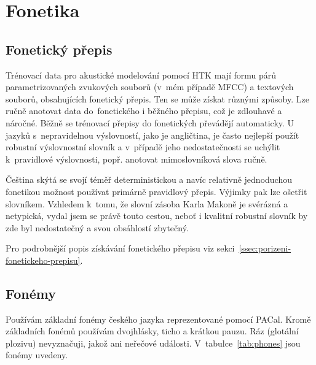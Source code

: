 \section{Fonetika}
\label{sec:ac:fonetika}

\subsection{Fonetický přepis}

Trénovací data pro akustické modelování pomocí HTK mají formu párů
parametrizovaných zvukových souborů (v~mém případě MFCC) a textových souborů,
obsahujících fonetický přepis. Ten se může získat různými způsoby. Lze ručně
anotovat data do~fonetického i běžného přepisu, což je zdlouhavé a náročné. Běžně
se trénovací přepisy do fonetických převádějí automaticky. U jazyků
s~nepravidelnou výslovností, jako je angličtina, je často nejlepší použít
robustní výslovnostní slovník a v~případě jeho nedostatečnosti se uchýlit
k~pravidlové výslovnosti, popř. anotovat mimoslovníková slova ručně.

Čeština skýtá se svojí téměř deterministickou a navíc relativně jednoduchou
fonetikou možnost používat primárně pravidlový přepis. Výjimky pak lze ošetřit
slovníkem. Vzhledem k~tomu, že slovní zásoba Karla Makoně je svérázná a
netypická, vydal jsem se právě touto cestou, neboť i kvalitní robustní slovník
by zde byl nedostatečný a svou obsáhlostí zbytečný.

Pro podrobnější popis získávání fonetického přepisu viz sekci~\ref{ssec:porizeni-fonetickeho-prepisu}.

\subsection{Fonémy}


Používám základní fonémy českého jazyka\cite{palkova1992fonetika}
reprezentované pomocí PACal\cite{nouza1997phonetic}. Kromě základních fonémů
používám dvojhlásky, ticho a krátkou pauzu. Ráz (glotální plozivu) nevyznačuji,
jakož ani neřečové události.
V~tabulce~\ref{tab:phones} jsou fonémy uvedeny.

